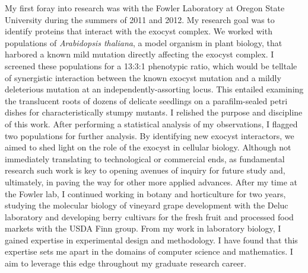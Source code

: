 My first foray into research was with the Fowler Laboratory at Oregon State University during the summers of 2011 and 2012.
My research goal was to identify proteins that interact with the exocyst complex.
We worked with populations of \textit{Arabidopsis thaliana}, a model organism in plant biology, that harbored a known mild mutation directly affecting the exocyst complex.
I screened these populations for a 13:3:1 phenotypic ratio, which would be telltale of synergistic interaction between the known exocyst mutation and a mildly deleterious mutation at an independently-assorting locus.
This entailed examining the translucent roots of dozens of delicate seedlings on a parafilm-sealed petri dishes for characteristically stumpy mutants.
I relished the purpose and discipline of this work.
After performing a statistical analysis of my observations, I flagged two populations for further analysis.
By identifying new exocyst interactors, we aimed to shed light on the role of the exocyst in cellular biology.
Although not immediately translating to technological or commercial ends, as fundamental research such work is key to opening avenues of inquiry for future study and, ultimately, in paving the way for other more applied advances.
After my time at the Fowler lab, I continued working in botany and horticulture for two years, studying the molecular biology of vineyard grape development with the Deluc laboratory and developing berry cultivars for the fresh fruit and processed food markets with the USDA Finn group.
From my work in laboratory biology, I gained expertise in experimental design and methodology.
I have found that this expertise sets me apart in the domains of computer science and mathematics.
I aim to leverage this edge throughout my graduate research career.

